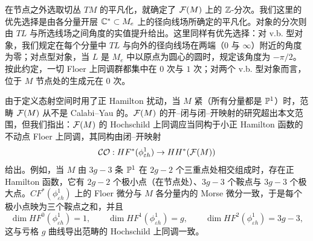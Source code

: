 在节点之外选取切丛 $TM$ 的平凡化，就确定了 $\mathcal{F}(M)$ 上的 $\mathbb{Z}$-分次。我们这里的优先选择是由各分量开层 $\mathbb{C}^*\subset M_e$ 上的径向线场所确定的平凡化。对象的分次则由 $TL$ 与所选线场之间角度的实值提升给出。这里同样有优先选择：对 v.b. 型对象，我们规定在每个分量中 $TL$ 与向外的径向线场在两端（$0$ 与 $\infty$）附近的角度为零；对点型对象，当 $L$ 是 $M_e$ 中以原点为圆心的圆时，规定该角度为 $-\pi/2$。按此约定，一切 Floer 上同调群都集中在 $0$ 次与 $1$ 次；对两个 v.b. 型对象而言，位于 $M$ 节点处的生成元在 $0$ 次。

\begin{remark}\label{rmk:notCY}
由于定义态射空间时用了正 Hamilton 扰动，当 $M$ 紧（所有分量都是 $\mathbb{P}^1$）时，范畴 $\mathcal{F}(M)$ 从不是 Calabi--Yau 的。$\mathcal{F}(M)$ 的开--闭与闭--开映射的研究超出本文范围，但我们指出：$\mathcal{F}(M)$ 的 Hochschild 上同调应当同构于小正 Hamilton 函数的不动点 Floer 上同调，其同构由闭--开映射
\[
\mathcal{CO}:HF^*(\phi^1_{\varepsilon h})\to HH^*(\mathcal{F}(M))
\]
给出。例如，当 $M$ 由 $3g-3$ 条 $\mathbb{P}^1$ 在 $2g-2$ 个三重点处相交组成时，存在正 Hamilton 函数，它有 $2g-2$ 个极小点（在节点处）、$3g-3$ 个鞍点与 $3g-3$ 个极大点。$CF^*(\phi^1_{\varepsilon h})$ 上的 Floer 微分与 $M$ 各分量内的 Morse 微分一致，于是每个极小点映为三个鞍点之和，并且
\[
\dim HF^0(\phi^1_{\varepsilon h})=1,\qquad
\dim HF^1(\phi^1_{\varepsilon h})=g,\qquad
\dim HF^2(\phi^1_{\varepsilon h})=3g-3,
\]
这与亏格 $g$ 曲线导出范畴的 Hochschild 上同调一致。
\end{remark}
